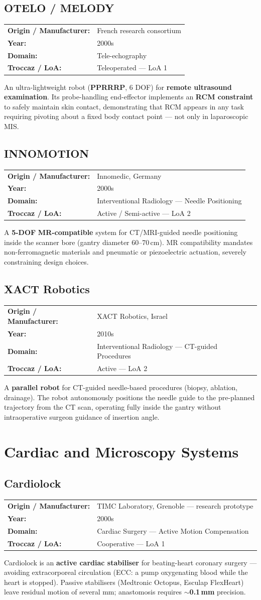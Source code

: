 \documentclass[11pt,a4paper,twoside]{report}
\makeatletter
\newcommand{\robotmeta}[4]{%
  \noindent\begin{tabular}{@{}ll@{}}
    \textbf{Origin / Manufacturer:} & #1 \\
    \textbf{Year:}                  & #2 \\
    \textbf{Domain:}                & #3 \\
    \textbf{Troccaz / LoA:}         & #4 \\
  \end{tabular}\par\smallskip\noindent}
\makeatother
\begin{document}
\section{OTELO / MELODY}
\robotmeta{French research consortium}{2000s}{Tele-echography}{Teleoperated — LoA 1}
An ultra-lightweight robot (\textbf{PPRRRP}, 6 DOF) for \textbf{remote ultrasound examination}. Its probe-handling end-effector implements an \textbf{RCM constraint} to safely maintain skin contact, demonstrating that RCM appears in any task requiring pivoting about a fixed body contact point — not only in laparoscopic MIS.

\section{INNOMOTION}
\robotmeta{Innomedic, Germany}{2000s}{Interventional Radiology — Needle Positioning}{Active / Semi-active — LoA 2}
A \textbf{5-DOF} \textbf{MR-compatible} system for CT/MRI-guided needle positioning inside the scanner bore (gantry diameter 60--70\,cm). MR compatibility mandates non-ferromagnetic materials and pneumatic or piezoelectric actuation, severely constraining design choices.

\section{XACT Robotics}
\robotmeta{XACT Robotics, Israel}{2010s}{Interventional Radiology — CT-guided Procedures}{Active — LoA 2}
A \textbf{parallel robot} for CT-guided needle-based procedures (biopsy, ablation, drainage). The robot autonomously positions the needle guide to the pre-planned trajectory from the CT scan, operating fully inside the gantry without intraoperative surgeon guidance of insertion angle.

\chapter{Cardiac and Microscopy Systems}

\section{Cardiolock}
\robotmeta{TIMC Laboratory, Grenoble — research prototype}{2000s}{Cardiac Surgery — Active Motion Compensation}{Cooperative — LoA 1}
Cardiolock is an \textbf{active cardiac stabiliser} for beating-heart coronary surgery — avoiding extracorporeal circulation (ECC: a pump oxygenating blood while the heart is stopped). Passive stabilisers (Medtronic Octopus, Esculap FlexHeart) leave residual motion of several mm; anastomosis requires $\sim$\textbf{0.1\,mm} precision.
\end{document}
